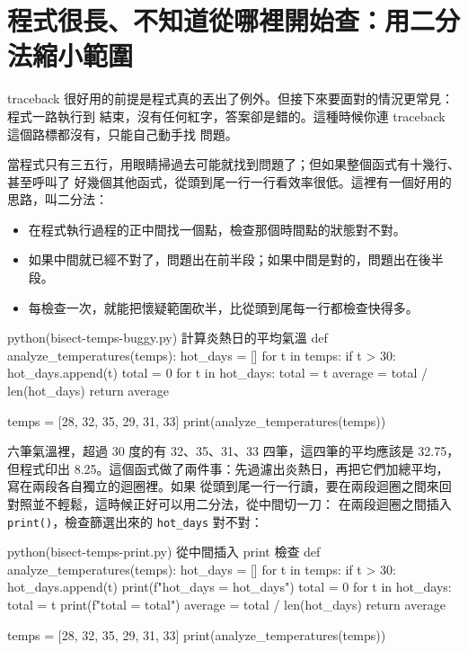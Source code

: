 \section{程式很長、不知道從哪裡開始查：用二分法縮小範圍}
\label{sec:bisect-debug}

traceback 很好用的前提是程式真的丟出了例外。但接下來要面對的情況更常見：程式一路執行到
結束，沒有任何紅字，答案卻是錯的。這種時候你連 traceback 這個路標都沒有，只能自己動手找
問題。

當程式只有三五行，用眼睛掃過去可能就找到問題了；但如果整個函式有十幾行、甚至呼叫了
好幾個其他函式，從頭到尾一行一行看效率很低。這裡有一個好用的思路，叫二分法：

\begin{itemize}
\item 在程式執行過程的正中間找一個點，檢查那個時間點的狀態對不對。
\item 如果中間就已經不對了，問題出在前半段；如果中間是對的，問題出在後半段。
\item 每檢查一次，就能把懷疑範圍砍半，比從頭到尾每一行都檢查快得多。
\end{itemize}

\begin{example}{python}{(bisect-temps-buggy.py) 計算炎熱日的平均氣溫}
def analyze_temperatures(temps):
    hot_days = []
    for t in temps:
        if t > 30:
            hot_days.append(t)
    total = 0
    for t in hot_days:
        total = t
    average = total / len(hot_days)
    return average

temps = [28, 32, 35, 29, 31, 33]
print(analyze_temperatures(temps))
\end{example}


六筆氣溫裡，超過 30 度的有 32、35、31、33 四筆，這四筆的平均應該是 32.75，但程式印出
8.25。這個函式做了兩件事：先過濾出炎熱日，再把它們加總平均，寫在兩段各自獨立的迴圈裡。如果
從頭到尾一行一行讀，要在兩段迴圈之間來回對照並不輕鬆，這時候正好可以用二分法，從中間切一刀：
在兩段迴圈之間插入 \texttt{print()}，檢查篩選出來的 \texttt{hot\_days} 對不對：

\begin{example}{python}{(bisect-temps-print.py) 從中間插入 print 檢查}
def analyze_temperatures(temps):
    hot_days = []
    for t in temps:
        if t > 30:
            hot_days.append(t)
    print(f"hot_days = {hot_days}")
    total = 0
    for t in hot_days:
        total = t
    print(f"total = {total}")
    average = total / len(hot_days)
    return average

temps = [28, 32, 35, 29, 31, 33]
print(analyze_temperatures(temps))
\end{example}

